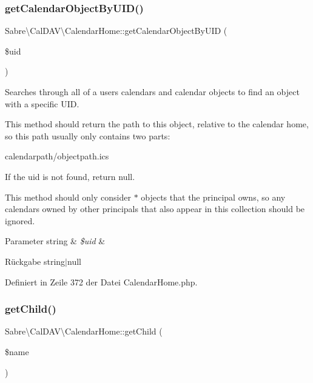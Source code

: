 \subsubsection{\texorpdfstring{get\+Calendar\+Object\+By\+U\+I\+D()}{getCalendarObjectByUID()}}
{\footnotesize\ttfamily Sabre\textbackslash{}\+Cal\+D\+A\+V\textbackslash{}\+Calendar\+Home\+::get\+Calendar\+Object\+By\+U\+ID (\begin{DoxyParamCaption}\item[{}]{\$uid }\end{DoxyParamCaption})}

Searches through all of a users calendars and calendar objects to find an object with a specific U\+ID.

This method should return the path to this object, relative to the calendar home, so this path usually only contains two parts\+:

calendarpath/objectpath.\+ics

If the uid is not found, return null.

This method should only consider $\ast$ objects that the principal owns, so any calendars owned by other principals that also appear in this collection should be ignored.


\begin{DoxyParams}[1]{Parameter}
string & {\em \$uid} & \\
\hline
\end{DoxyParams}
\begin{DoxyReturn}{Rückgabe}
string$\vert$null 
\end{DoxyReturn}


Definiert in Zeile 372 der Datei Calendar\+Home.\+php.

\mbox{\label{class_sabre_1_1_cal_d_a_v_1_1_calendar_home_a3bec69b865192277e087af7d3ec9da46}} 
\subsubsection{\texorpdfstring{get\+Child()}{getChild()}}
{\footnotesize\ttfamily Sabre\textbackslash{}\+Cal\+D\+A\+V\textbackslash{}\+Calendar\+Home\+::get\+Child (\begin{DoxyParamCaption}\item[{}]{\$name }\end{DoxyParamCaption})}

